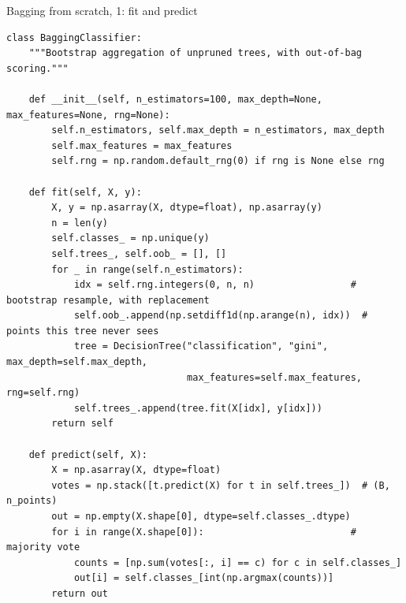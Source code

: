 \documentclass[10pt,aspectratio=169]{beamer}
\begin{document}
\begin{frame}[fragile]{Bagging from scratch, 1: fit and predict}
\begin{lstlisting}[basicstyle=\ttfamily\tiny]
class BaggingClassifier:
    """Bootstrap aggregation of unpruned trees, with out-of-bag scoring."""

    def __init__(self, n_estimators=100, max_depth=None, max_features=None, rng=None):
        self.n_estimators, self.max_depth = n_estimators, max_depth
        self.max_features = max_features
        self.rng = np.random.default_rng(0) if rng is None else rng

    def fit(self, X, y):
        X, y = np.asarray(X, dtype=float), np.asarray(y)
        n = len(y)
        self.classes_ = np.unique(y)
        self.trees_, self.oob_ = [], []
        for _ in range(self.n_estimators):
            idx = self.rng.integers(0, n, n)                 # bootstrap resample, with replacement
            self.oob_.append(np.setdiff1d(np.arange(n), idx))  # points this tree never sees
            tree = DecisionTree("classification", "gini", max_depth=self.max_depth,
                                max_features=self.max_features, rng=self.rng)
            self.trees_.append(tree.fit(X[idx], y[idx]))
        return self

    def predict(self, X):
        X = np.asarray(X, dtype=float)
        votes = np.stack([t.predict(X) for t in self.trees_])  # (B, n_points)
        out = np.empty(X.shape[0], dtype=self.classes_.dtype)
        for i in range(X.shape[0]):                          # majority vote
            counts = [np.sum(votes[:, i] == c) for c in self.classes_]
            out[i] = self.classes_[int(np.argmax(counts))]
        return out
\end{lstlisting}
\end{frame}
\end{document}
